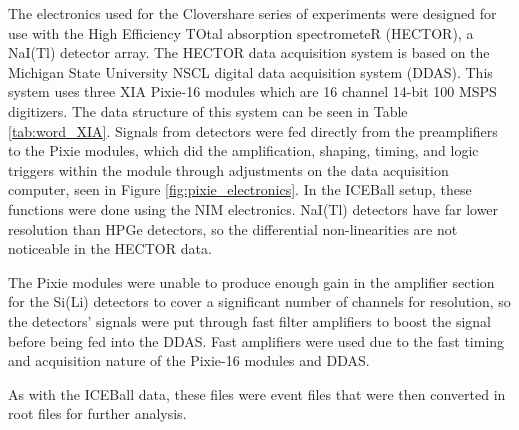 



The electronics used for the Clovershare series of experiments were designed for use with the High Efficiency TOtal absorption spectrometeR (HECTOR), a NaI(Tl) detector array\citep{reingold19:_HECTOR}. The HECTOR data acquisition system is based on the Michigan State University NSCL digital data acquisition system (DDAS). This system uses three XIA Pixie-16 modules \citep{xia:_pixie} which are 16 channel 14-bit 100 MSPS digitizers. The data structure of this system can be seen in Table \ref{tab:word_XIA}. Signals from detectors were fed directly from the preamplifiers to the Pixie modules, which did the amplification, shaping, timing, and logic triggers within the module through adjustments on the data acquisition computer, seen in Figure \ref{fig:pixie_electronics}. In the ICEBall setup, these functions were done using the NIM electronics. NaI(Tl) detectors have far lower resolution than HPGe detectors, so the differential non-linearities are not noticeable in the HECTOR data.



The Pixie modules were unable to produce enough gain in the amplifier section for the Si(Li) detectors to cover a significant number of channels for resolution, so the detectors' signals were put through fast filter amplifiers \citep{ortec:_fastamp} to boost the signal before being fed into the DDAS. Fast amplifiers were used due to the fast timing and acquisition nature of the Pixie-16 modules and DDAS. 

As with the ICEBall data, these files were event files that were then converted in root files for further analysis.

